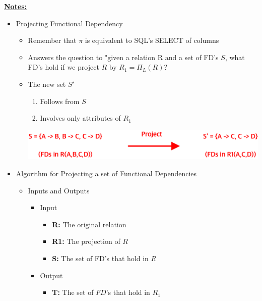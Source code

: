 \documentclass[12pt]{article}
\begin{document}
\begin{enumerate}[1.]
\begin{enumerate}[a)]
        \underline{\textbf{Notes:}}

        \bigskip

        \begin{itemize}
            \item Projecting Functional Dependency
            \begin{itemize}
                \item Remember that $\pi$ is equivalent to SQL's SELECT of columns
                \item Answers the question to "given a relation R and a set of FD's $S$,
                what FD's hold if we project $R$ by $R_1 = \Pi_L(R)$?
                \item The new set $S'$
                \begin{enumerate}[1.]
                    \item Follows from $S$
                    \item Involves only attributes of $R_1$
                \end{enumerate}

                \bigskip

                \begin{center}
                \includegraphics[width=0.7\linewidth]{images/worksheet_12_solution_2.png}
                \end{center}
            \end{itemize}

            \item Algorithm for Projecting a set of Functional Dependencies
            \begin{itemize}
                \item Inputs and Outputs
                \begin{itemize}
                    \item Input
                    \begin{itemize}
                        \item \textbf{R:} The original relation
                        \item \textbf{R1:} The projection of $R$
                        \item \textbf{S:} The set of FD's that hold in $R$
                    \end{itemize}
                    \item Output
                    \begin{itemize}
                        \item \textbf{T:} The set of $FD$'s that hold in $R_1$
                    \end{itemize}
                \end{itemize}


\end{itemize}
\end{itemize}
\end{enumerate}
\end{enumerate}
\end{document}

